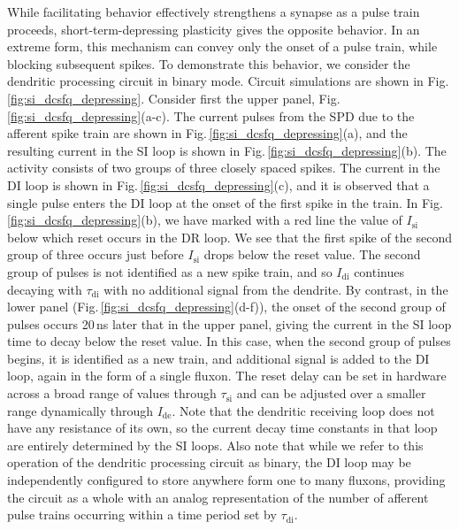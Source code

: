 \documentclass[twocolumn]{article}
\begin{document}
While facilitating behavior effectively strengthens a synapse as a pulse train proceeds, short-term-depressing plasticity gives the opposite behavior. In an extreme form, this mechanism can convey only the onset of a pulse train, while blocking subsequent spikes. To demonstrate this behavior, we consider the dendritic processing circuit in binary mode. Circuit simulations are shown in Fig.\,\ref{fig:si_dcsfq_depressing}. Consider first the upper panel, Fig.\,\ref{fig:si_dcsfq_depressing}(a-c). The current pulses from the SPD due to the afferent spike train are shown in Fig.\,\ref{fig:si_dcsfq_depressing}(a), and the resulting current in the SI loop is shown in Fig.\,\ref{fig:si_dcsfq_depressing}(b). The activity consists of two groups of three closely spaced spikes. The current in the DI loop is shown in Fig.\,\ref{fig:si_dcsfq_depressing}(c), and it is observed that a single pulse enters the DI loop at the onset of the first spike in the train. In Fig.\,\ref{fig:si_dcsfq_depressing}(b), we have marked with a red line the value of $I_{\mathrm{si}}$ below which reset occurs in the DR loop. We see that the first spike of the second group of three occurs just before $I_{\mathrm{si}}$ drops below the reset value. The second group of pulses is not identified as a new spike train, and so $I_{\mathrm{di}}$ continues decaying with $\tau_{\mathrm{di}}$ with no additional signal from the dendrite. By contrast, in the lower panel (Fig.\,\ref{fig:si_dcsfq_depressing}(d-f)), the onset of the second group of pulses occurs 20\,ns later that in the upper panel, giving the current in the SI loop time to decay below the reset value. In this case, when the second group of pulses begins, it is identified as a new train, and additional signal is added to the DI loop, again in the form of a single fluxon. The reset delay can be set in hardware across a broad range of values through $\tau_{\mathrm{si}}$ and can be adjusted over a smaller range dynamically through $I_{\mathrm{de}}$. Note that the dendritic receiving loop does not have any resistance of its own, so the current decay time constants in that loop are entirely determined by the SI loops. Also note that while we refer to this operation of the dendritic processing circuit as binary, the DI loop may be independently configured to store anywhere form one to many fluxons, providing the circuit as a whole with an analog representation of the number of afferent pulse trains occurring within a time period set by $\tau_{\mathrm{di}}$.
\end{document}

